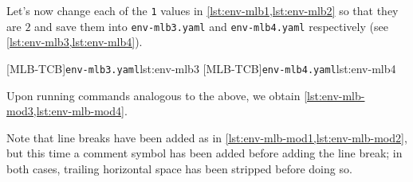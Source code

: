   \begin{example}
  Let's now change each of the \texttt{1} values in \cref{lst:env-mlb1,lst:env-mlb2} so
  that they are $2$ and save them into \texttt{env-mlb3.yaml} and \texttt{env-mlb4.yaml}
  respectively (see \cref{lst:env-mlb3,lst:env-mlb4}). 

  \begin{cmhtcbraster}
   [MLB-TCB]{\texttt{env-mlb3.yaml}}{lst:env-mlb3}
   [MLB-TCB]{\texttt{env-mlb4.yaml}}{lst:env-mlb4}
  \end{cmhtcbraster}

  Upon running commands analogous to the above, we obtain
  \cref{lst:env-mlb-mod3,lst:env-mlb-mod4}.

  \begin{widepage}
   \begin{minipage}{.56\linewidth}
   \end{minipage}
   \hfill
   \begin{minipage}{.43\linewidth}
   \end{minipage}
  \end{widepage}

  Note that line breaks have been added as in \cref{lst:env-mlb-mod1,lst:env-mlb-mod2}, but
  this time a comment symbol has been added before adding the line break; in both cases,
  trailing horizontal space has been stripped before doing so.
  \end{example}

